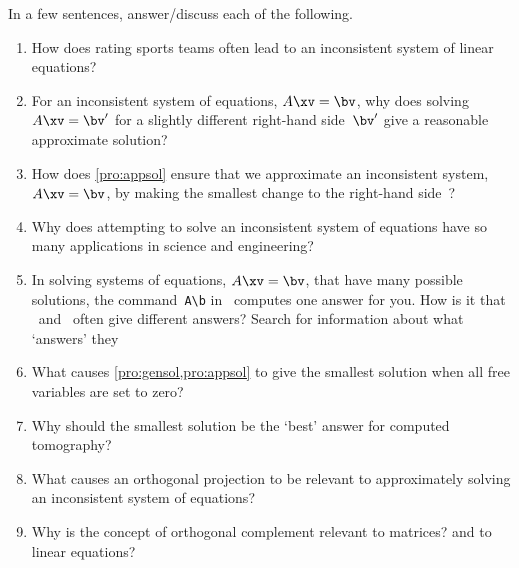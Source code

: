 \begin{exercise}  
In a few sentences, answer\slash discuss each of the following.
\begin{enumerate}
\item How does rating sports teams often lead to an inconsistent system of linear equations?

\item For an inconsistent system of equations, \(A\xv=\bv\), why does solving \(A\xv=\bv'\) for a slightly different right-hand side~\(\bv'\) give a reasonable approximate solution?

\item How does \cref{pro:appsol} ensure that we approximate an inconsistent system, \(A\xv=\bv\), by making the smallest change to the right-hand side~\bv?

\item Why does attempting to solve an inconsistent system of equations have so many applications in science and engineering?

\item In solving systems of equations, \(A\xv=\bv\), that have many possible solutions, the command~\verb|A\b| in \script\ computes one answer for you.  How is it that \script[1]\ and \script[2]\ often give different answers?  Search for information about what `answers' they 

\item What causes \cref{pro:gensol,pro:appsol} to give the smallest solution when all free variables are set to zero?

\item Why should the smallest solution be the `best' answer for computed tomography?

\item What causes an orthogonal projection to be relevant to approximately solving an inconsistent system of equations?


\item Why is the concept of orthogonal complement relevant to matrices?  and to linear equations?

\end{enumerate}
\end{exercise}

\begin{comment}%
why, what caused X?
how did X occur?
what-if? what-if-not?
how does X compare with Y?
what is the evidence for X?
why is X important?
\end{comment}


